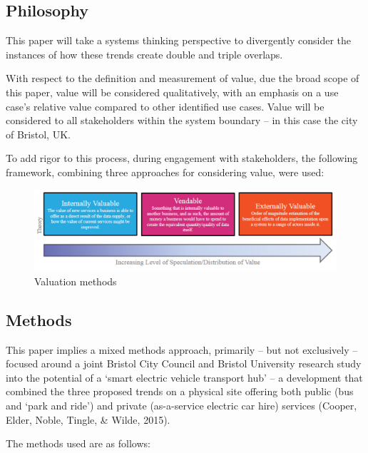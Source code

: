 \documentclass[journal]{IEEEtran}
\begin{document}
\subsection{Philosophy}

This paper will take a systems thinking perspective to divergently
consider the instances of how these trends create double and triple
overlaps.

With respect to the definition and measurement of value, due the broad
scope of this paper, value will be considered qualitatively, with an
emphasis on a use case's relative value compared to other identified
use cases. Value will be considered to all stakeholders within the
system boundary – in this case the city of Bristol, UK.
 
To add rigor to this process, during engagement with stakeholders, the
following framework, combining three approaches for considering value,
were used:

\begin{figure}[!h]
\centering
\includegraphics[width=\columnwidth]{images/valuationmethods.png}
\caption{Valuation methods}
\label{fig:bristolhub}
\end{figure}


\subsection{Methods}

This paper implies a mixed methods approach, primarily – but not
exclusively -- focused around a joint Bristol City Council and Bristol
University research study into the potential of a `smart electric
vehicle transport hub' -- a development that combined the three
proposed trends on a physical site offering both public (bus and `park
and ride') and private (as-a-service electric car hire) services
(Cooper, Elder, Noble, Tingle, \& Wilde, 2015).

The methods used are as follows:
\end{document}

